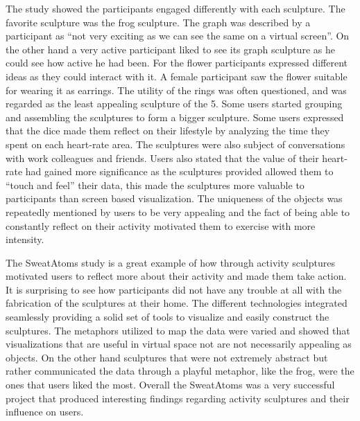 \documentclass[../medieninformatik-arbeit.tex]{subfiles}
\begin{document}
The study showed the participants engaged differently with each sculpture. The favorite sculpture was the frog sculpture. The graph was described by a participant as ``not very exciting as we can see the same on a virtual screen''. On the other hand a very active participant liked to see its graph sculpture as he could see how active he had been. For the flower participants expressed different ideas as they could interact with it. A female participant saw the flower suitable for wearing it as earrings. The utility of the rings was often questioned, and was regarded as the least appealing sculpture of the 5. Some users started grouping and assembling the sculptures to form a bigger sculpture. Some users expressed that the dice made them reflect on their lifestyle by analyzing the time they spent on each heart-rate area. The sculptures were also subject of conversations with work colleagues and friends. Users also stated that the value of their heart-rate had gained more significance as the sculptures provided allowed them to ``touch and feel'' their data, this made the sculptures more valuable to participants than screen based visualization. The uniqueness of the objects was repeatedly mentioned by users to be very appealing and the fact of being able to constantly reflect on their activity motivated them to exercise with more intensity.

The SweatAtoms study is a great example of how through activity sculptures motivated users to reflect more about their activity and made them take action. It is surprising to see how participants did not have any trouble at all with the fabrication of the sculptures at their home. The different technologies integrated seamlessly providing a solid set of tools to visualize and easily construct the sculptures. The metaphors utilized to map the data were varied and showed that visualizations that are useful in virtual space not are not necessarily appealing as objects. On the other hand sculptures that were not extremely abstract but rather communicated the data through a playful metaphor, like the frog, were the ones that users liked the most. Overall the SweatAtoms was a very successful project that produced interesting findings regarding activity sculptures and their influence on users.   
\end{document}
